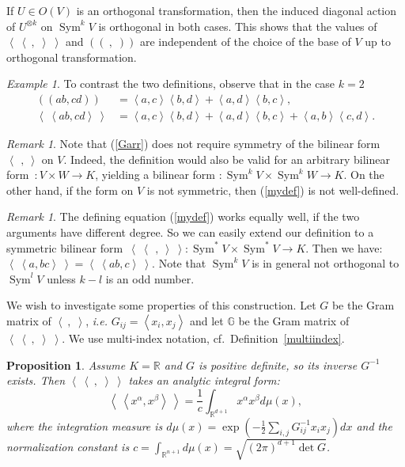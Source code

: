 \documentclass{amsart}
\DeclareMathOperator{\Sym}{Sym}
\newcommand{\ie}{{\it i.e. }}
\newcommand{\bra}{\left<\!\!\!\:\left<}
\newcommand{\ket}{\right>\!\!\!\:\right>}
\newcommand{\G}{\mathbb{G}}
\newcommand{\R}{\mathbb{R}}
\theoremstyle{plain}
\newtheorem{proposition}[theorem]{Proposition}
\theoremstyle{definition}
\theoremstyle{remark}
\newtheorem{remark}[theorem]{Remark}
\newtheorem{example}[theorem]{Example}
\begin{document}
If $U\in O(V)$ is an orthogonal transformation, then the induced diagonal action of $U^{\otimes k}$ on $\Sym^kV$ is orthogonal in both cases. This shows that the values of $\bra\ ,\;\ket$ and $\left(\!\left(\ ,\;\right)\!\right)$ are independent of the choice of the base of $V$ up to orthogonal transformation. 
\begin{example}
To contrast the two definitions, observe that in the case $k=2$
\begin{align}
\left(\!\left( ab,cd \right)\!\right) &= \left<a,c\right>\left<b,d\right>+\left<a,d\right>\left<b,c\right>, \\
\bra ab,cd\ket &= \left<a,c\right>\left<b,d\right>+\left<a,d\right>\left<b,c\right> + \left<a,b\right>\left<c,d\right>.
\end{align}
\end{example}
\begin{remark}
Note that (\ref{Garr}) does not require symmetry of the bilinear form $\left<\,\ ,\ \right>$ on $V$. Indeed, the definition would also be valid for an arbitrary bilinear form~$: V\times W \rightarrow K$, yielding a bilinear form $:\Sym^kV\times\Sym^kW\rightarrow K$. On the other hand, if the form on $V$ is not symmetric, then (\ref{mydef}) is not well-defined.
\end{remark}
\begin{remark}
The defining equation (\ref{mydef}) works equally well, if the two arguments have different degree. So we can easily extend our definition to a symmetric bilinear form~$\bra\ \,,\ \ket:\Sym^*V\times\Sym^*V \rightarrow K$. Then we have: $\bra a,bc\ket =\bra ab,c\ket$. Note that $\Sym^kV$ is in general not orthogonal to $\Sym^lV$ unless $k-l$ is an odd number.
\end{remark}
We wish to investigate some properties of this construction. Let $G$ be the Gram matrix of $\left< \ ,\;\right>$, \ie $G_{ij} = \left<x_i,x_j\right>$ and
let $\G$ be the Gram matrix of $\bra\ ,\;\ket$. We use multi-index notation, cf.~Definition~\ref{multiindex}.
\begin{proposition} \label{intequiv}Assume $K=\R$ and $G$ is positive definite, so its inverse $G^{-1} $ exists. Then $\bra\ ,\;\ket$ takes an analytic integral form:
\begin{equation*}
\bra x^\alpha, x^\beta \ket = \frac{1}{c}\int_{\R^{d+1}} x^\alpha x^\beta d\mu(x),
\end{equation*}
where the integration measure is $d\mu(x) = \exp\left(-\frac{1}{2}\sum_{i,j} G^{-1}_{ij}x_ix_j\right)dx$ and the normalization constant is $c=\int_{\R^{n+1}} d\mu(x)=\sqrt{(2\pi)^{d+1}\det G}$.
\end{proposition}
\end{document}
